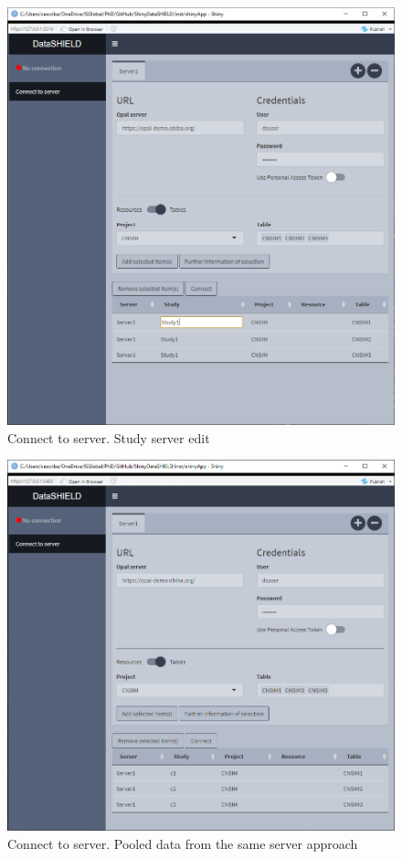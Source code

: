 \documentclass[
]{book}
\begin{document}
\begin{figure}

{\centering \includegraphics[width=12.67in]{images/data_entry7} 

}

\caption{Connect to server. Study server edit}\label{fig:dataentry7}
\end{figure}

\begin{figure}

{\centering \includegraphics[width=12.68in]{images/data_entry8} 

}

\caption{Connect to server. Pooled data from the same server approach}\label{fig:dataentry8}
\end{figure}
\end{document}
